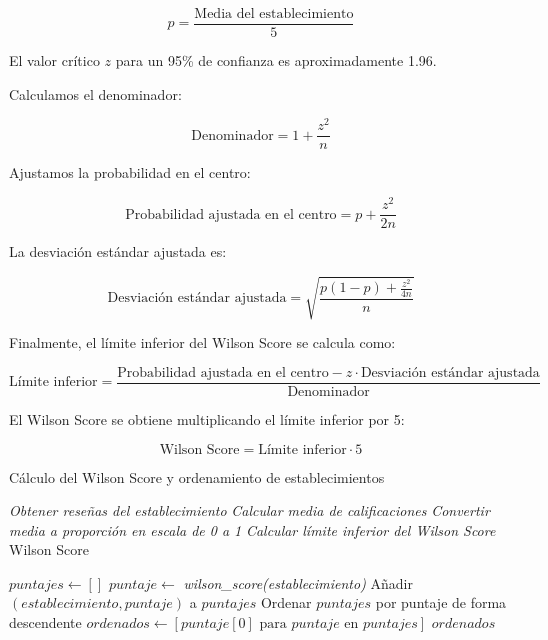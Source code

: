 \[
    p = \frac{\text{Media del establecimiento}}{5}
\]

El valor crítico $z$ para un 95\% de confianza es aproximadamente 1.96.

Calculamos el denominador:

\[
    \text{Denominador} = 1 + \frac{z^2}{n}
\]

Ajustamos la probabilidad en el centro:

\[
    \text{Probabilidad ajustada en el centro} = p + \frac{z^2}{2n}
\]

La desviación estándar ajustada es:

\[
    \text{Desviación estándar ajustada} = \sqrt{\frac{p(1-p) + \frac{z^2}{4n}}{n}}
\]

Finalmente, el límite inferior del Wilson Score se calcula como:

\[
    \text{Límite inferior} = \frac{\text{Probabilidad ajustada en el centro} - z \cdot \text{Desviación estándar ajustada}}{\text{Denominador}}
\]

El Wilson Score se obtiene multiplicando el límite inferior por 5:

\[
    \text{Wilson Score} = \text{Límite inferior} \cdot 5
\]

\clearpage
\begin{algorithm}
    \caption{Cálculo del Wilson Score y ordenamiento de establecimientos}
    \label{alg:wilson_score_ordenamiento}
    \begin{algorithmic}[1]

        \State \textit{Obtener reseñas del establecimiento}
        \State \textit{Calcular media de calificaciones}
        \State \textit{Convertir media a proporción en escala de 0 a 1}
        \State \textit{Calcular límite inferior del Wilson Score}
        \State \Return Wilson Score
        \EndFunction

        \State $puntajes \leftarrow []$
        \State $puntaje \leftarrow$ \textit{wilson\_score(establecimiento)}
        \State Añadir $(establecimiento, puntaje)$ a $puntajes$
        \EndFor
        \State Ordenar $puntajes$ por puntaje de forma descendente
        \State $ordenados \leftarrow [puntaje[0] \text{ para } puntaje \text{ en } puntajes]$
        \State \Return $ordenados$
        \EndFunction
    \end{algorithmic}
\end{algorithm}

